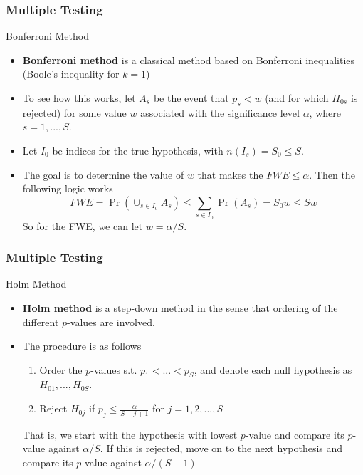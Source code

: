 \documentclass{beamer}
\begin{document}
\begin{frame}
\frametitle{Multiple Testing}
Bonferroni Method
\begin{itemize}
\item \textbf{Bonferroni method} is a classical method based on Bonferroni inequalities (Boole's inequality for $k=1$)
\item To see how this works, let $A_s$ be the event that $p_s<w$ (and for which $H_{0s}$ is rejected) for some value $w$ associated with the significance level $\alpha$, where $s=1,...,S$. 
\item Let $I_0$ be indices for the true hypothesis, with $n(I_s)=S_0\leq S.$ 
\item The goal is to determine the value of $w$ that makes the $FWE\leq\alpha$.  Then the following logic works
\[
FWE = \Pr(\cup_{s\in I_0}A_s)\leq \sum_{s\in I_0}\Pr(A_s) = S_0 w \leq S w
\]
So for the FWE, we can let $w=\alpha/S$.
\end{itemize}
\end{frame}

\begin{frame}
\frametitle{Multiple Testing}
Holm Method
\begin{itemize}
\item \textbf{Holm method} is a step-down method in the sense that ordering of the different $p$-values are involved.
\item The procedure is as follows
\begin{enumerate}
\item Order the $p$-values s.t. $p_1<...<p_S$, and denote each null hypothesis as $H_{01},...,H_{0S}$. 
\item Reject $H_{0j}$ if $p_j \leq \frac{\alpha}{S-j+1}$ for $j=1,2,...,S$
\end{enumerate}
That is, we start with the hypothesis with lowest $p$-value and compare its $p$-value against $\alpha/S$. If this is rejected, move on to the next hypothesis and compare its $p$-value against $\alpha/(S-1)$
\end{itemize}
\end{frame}
\end{document}
